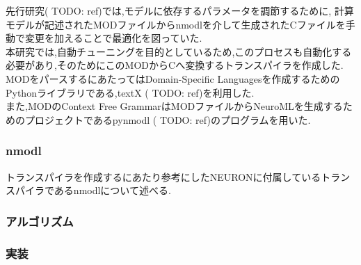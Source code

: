 先行研究( TODO: ref)では,モデルに依存するパラメータを調節するために,
計算モデルが記述されたMODファイルからnmodlを介して生成されたCファイルを手動で変更を加えることで最適化を図っていた.\\
本研究では,自動チューニングを目的としているため,このプロセスも自動化する必要があり,そのためにこのMODからCへ変換するトランスパイラを作成した.\\
MODをパースするにあたってはDomain-Specific Languagesを作成するためのPythonライブラリである,textX ( TODO: ref)を利用した.\\
また,MODのContext Free GrammarはMODファイルからNeuroMLを生成するためのプロジェクトであるpynmodl ( TODO: ref)のプログラムを用いた.\\

\subsubsection{nmodl}
トランスパイラを作成するにあたり参考にしたNEURONに付属しているトランスパイラであるnmodlについて述べる.\\


\subsubsection{アルゴリズム}

\subsubsection{実装}
